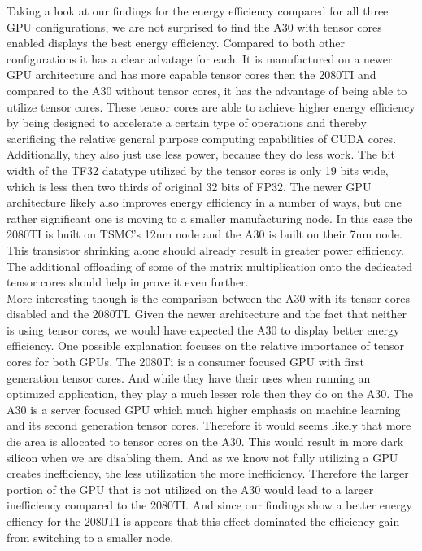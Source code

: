 \documentclass[conference]{IEEEtran}
\begin{document}
Taking a look at our findings for the energy efficiency compared for all three GPU configurations, we are not surprised to find the A30 with tensor cores enabled displays the best energy efficiency. Compared to both other configurations it has a clear advatage for each. It is manufactured on a newer GPU architecture and has more capable tensor cores then the 2080TI and compared to the A30 without tensor cores, it has the advantage of being able to utilize tensor cores. These tensor cores are able to achieve higher energy efficiency by being designed to accelerate a certain type of operations and thereby sacrificing the relative general purpose computing capabilities of CUDA cores. Additionally, they also just use less power, because they do less work. The bit width of the TF32 datatype utilized by the tensor cores is only 19 bits wide, which is less then two thirds of original 32 bits of FP32. The newer GPU architecture likely also improves energy efficiency in a number of ways, but one rather significant one is moving to a smaller manufacturing node. In this case the 2080TI is built on TSMC's 12nm node and the A30 is built on their 7nm node. This transistor shrinking alone should already result in greater power efficiency. The additional offloading of some of the matrix multiplication onto the dedicated tensor cores should help improve it even further.\\
More interesting though is the comparison between the A30 with its tensor cores disabled and the 2080TI. Given the newer architecture and the fact that neither is using tensor cores, we would have expected the A30 to display better energy efficiency. One possible explanation focuses on the relative importance of tensor cores for both GPUs. The 2080Ti is a consumer focused GPU with first generation tensor cores. And while they have their uses when running an optimized application, they play a much lesser role then they do on the A30. The A30 is a server focused GPU which much higher emphasis on machine learning and its second generation tensor cores. Therefore it would seems likely that more die area is allocated to tensor cores on the A30. This would result in more dark silicon when we are disabling them. And as we know not fully utilizing a GPU creates inefficiency, the less utilization the more inefficiency. Therefore the larger portion of the GPU that is not utilized on the A30 would lead to a larger inefficiency compared to the 2080TI. And since our findings show a better energy effiency for the 2080TI is appears that this effect dominated the efficiency gain from switching to a smaller node. \\
\end{document}
